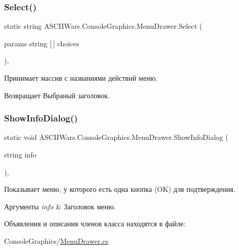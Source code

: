 \subsubsection{\texorpdfstring{Select()}{Select()}\hspace{0.1cm}{\footnotesize\ttfamily [4/4]}}
{\footnotesize\ttfamily static string A\+S\+C\+I\+I\+Wars.\+Console\+Graphics.\+Menu\+Drawer.\+Select (\begin{DoxyParamCaption}\item[{params string \mbox{[}$\,$\mbox{]}}]{choices }\end{DoxyParamCaption})\hspace{0.3cm}{\ttfamily [inline]}, {\ttfamily [static]}}



Принимает массив с названиями действий меню. 

\begin{DoxyReturn}{Возвращает}
Выбраный заголовок. 
\end{DoxyReturn}
\hypertarget{class_a_s_c_i_i_wars_1_1_console_graphics_1_1_menu_drawer_a48cc3b43302cba89239d72c3f6bcddab}{}\label{class_a_s_c_i_i_wars_1_1_console_graphics_1_1_menu_drawer_a48cc3b43302cba89239d72c3f6bcddab} 
\subsubsection{\texorpdfstring{Show\+Info\+Dialog()}{ShowInfoDialog()}}
{\footnotesize\ttfamily static void A\+S\+C\+I\+I\+Wars.\+Console\+Graphics.\+Menu\+Drawer.\+Show\+Info\+Dialog (\begin{DoxyParamCaption}\item[{string}]{info }\end{DoxyParamCaption})\hspace{0.3cm}{\ttfamily [inline]}, {\ttfamily [static]}}



Показывает меню, у которого есть одна кнопка ({\ttfamily OK}) для подтверждения. 


\begin{DoxyParams}{Аргументы}
{\em info} & Заголовок меню. \\
\hline
\end{DoxyParams}


Объявления и описания членов класса находятся в файле\+:\begin{DoxyCompactItemize}
\item 
Console\+Graphics/\hyperlink{_menu_drawer_8cs}{Menu\+Drawer.\+cs}\end{DoxyCompactItemize}
